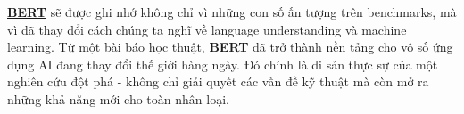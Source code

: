 \hyperref[acro:bert]{\textbf{BERT}} sẽ được ghi nhớ không chỉ vì những con số ấn tượng trên benchmarks, mà vì đã thay đổi cách chúng ta nghĩ về language understanding và machine learning. Từ một bài báo học thuật, \hyperref[acro:bert]{\textbf{BERT}} đã trở thành nền tảng cho vô số ứng dụng AI đang thay đổi thế giới hàng ngày. Đó chính là di sản thực sự của một nghiên cứu đột phá - không chỉ giải quyết các vấn đề kỹ thuật mà còn mở ra những khả năng mới cho toàn nhân loại.